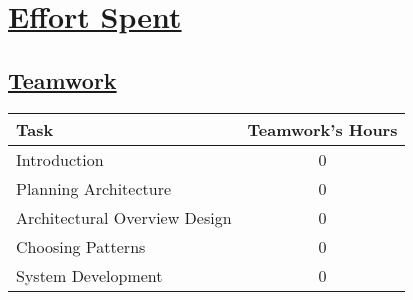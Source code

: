 \section[Effort Spent]{\hyperlink{toc}{Effort Spent}}
\label{sec:effortSpent}

\subsection[Teamwork]{\hyperlink{toc}{Teamwork}}
\vspace{2mm}
\begin{center}
	\begin{tabular}{| l | c |}
		\hline
		\textbf{Task} & \textbf{Teamwork's Hours} \\ \hline
		Introduction & 0 \\ \hline
		Planning Architecture & 0 \\ \hline
		Architectural Overview Design & 0 \\ \hline
		Choosing Patterns & 0 \\ \hline
		System Development & 0 \\
		\hline	
	\end{tabular}
\end{center}

